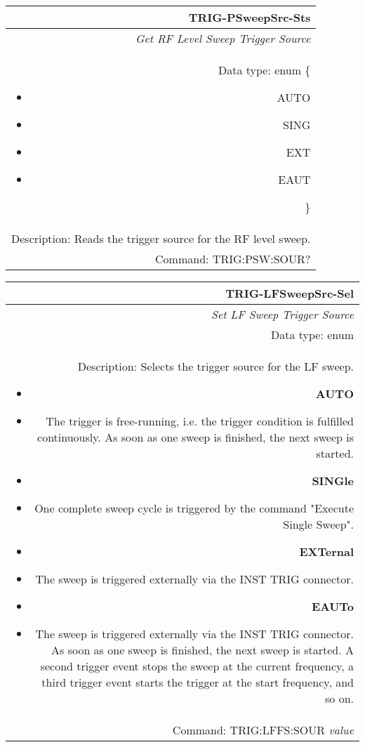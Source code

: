 \documentclass[openany]{article}
\begin{document}
		\begin{tabular}{N}
			\hline
			\bfseries TRIG-PSweepSrc-Sts \\ \hline
			\emph{Get RF Level Sweep Trigger Source} \\
			Data type: enum \{\begin{itemize}[noitemsep]
				\small
				\item[] AUTO
				\item[] SING
				\item[] EXT
				\item[] EAUT
			\end{itemize}\} \\ 
			Description: Reads the trigger source for the RF level sweep. \\
			Command: TRIG:PSW:SOUR? \\

		\end{tabular}
%
		\begin{tabular}{N}
			\hline
			\bfseries TRIG-LFSweepSrc-Sel \\ \hline
			\emph{Set LF Sweep Trigger Source} \\
			Data type: enum \\   
			Description: Selects the trigger source for the LF sweep.\begin{itemize}[noitemsep]
				\small
				\item[] \textbf{AUTO}
				\item[] The trigger is free-running, i.e. the trigger condition is fulfilled continuously. As soon as one sweep is finished, the next sweep is started.
                                \item[] \textbf{SINGle}
				\item[] One complete sweep cycle is triggered by the command "Execute Single Sweep".
				\item[] \textbf{EXTernal}
				\item[] The sweep is triggered externally via the INST TRIG connector.
                                \item[] \textbf{EAUTo}
				\item[] The sweep is triggered externally via the INST TRIG connector. As soon as one sweep is finished, the next sweep is started. A second trigger event stops the sweep at the current frequency, a third trigger event starts the trigger at the start frequency, and so on.

			\end{itemize} \\
			Command: TRIG:LFFS:SOUR \emph{value} \\

		\end{tabular}
\end{document}

